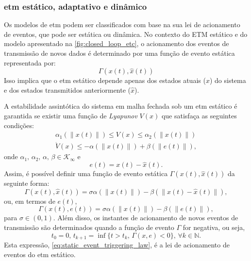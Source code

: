 \subsubsection{\acrshort{etm} estático, adaptativo e dinâmico} \label{section:etm_classification}

Os modelos de \acrshort{etm} podem ser classificados com base na sua lei de acionamento de eventos, que pode ser estática ou dinâmica. No contexto do ETM estático e do modelo apresentado na \autoref{fig:closed_loop_etc}, o acionamento dos eventos de transmissão de novos dados é determinado por uma função de evento estática representada por: \begin{equation}
  \Gamma(x(t), \hat{x}(t)) \label{eq:static_gamma_function_1}
\end{equation} Isso implica que o \acrshort{etm} estático depende apenas dos estados atuais ($x$) do sistema e dos estados transmitidos anteriormente ($\hat{x}$).

A estabilidade assintótica do sistema em malha fechada sob um \acrshort{etm} estático é garantida se existir uma função de \textit{Lyapunov }$V(x)$ que satisfaça as seguintes condições: \begin{gather}
  \alpha_1(\| x(t) \|) \leq V(x) \leq \alpha_2(\| x(t) \|) \label{eq:static_etm_v} \\[8pt]
  \dot{V}(x) \leq - \alpha(\|x(t)\|) + \beta(\|e(t)\|), \label{eq:static_etm_dot_v_1}
\end{gather} onde $ \alpha_1 , \, \alpha_2, \, \alpha, \, \beta \in \mathcal{K}_\infty $ e \begin{equation}
  e(t) = x(t) - \hat{x}(t).
\end{equation} Assim, é possível definir uma função de evento estática $ \Gamma(x(t), \hat{x}(t)) $ da seguinte forma: \begin{equation}
  \Gamma(x(t), \hat{x}(t)) = \sigma \alpha(\|x(t)\|)- \beta(\|x(t) - \hat{x}(t)\|),
\end{equation} ou, em termos de $e(t)$, \begin{equation}
  \Gamma(x(t), e(t)) = \sigma \alpha(\|x(t)\|)- \beta(\|e(t)\|),
  \label{eq:static_gamma_function_2}
\end{equation} 
para $ \sigma \in (0, 1) $. Além disso, os instantes de acionamento de novos eventos de transmissão são determinados quando a função de evento $\Gamma$ for negativa, ou seja, \begin{equation}
  t_0 = 0, \, t_{k+1} = \inf\{t > t_k, \, \Gamma(x, e) < 0\}, \, \forall k \in \mathbb{N}. \label{eq:static_event_triggering_law}
\end{equation} Esta expressão, \eqref{eq:static_event_triggering_law}, é a lei de acionamento de eventos do \acrshort{etm} estático. 

